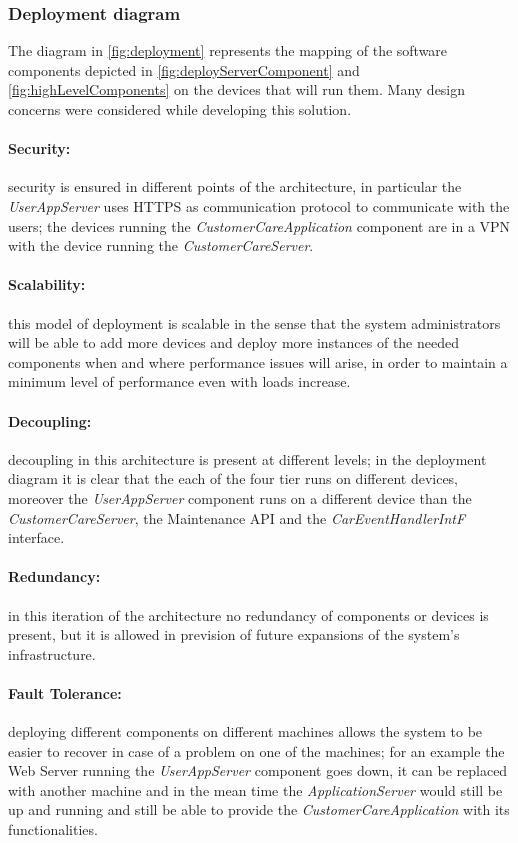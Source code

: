 \subsubsection{Deployment diagram}
The diagram in \autoref{fig:deployment} represents the mapping of the software components depicted in \autoref{fig:deployServerComponent} and \autoref{fig:highLevelComponents} on the devices that will run them. Many design concerns were considered while developing this solution.
\paragraph{Security:}security is ensured in different points of the architecture, in particular the \emph{UserAppServer} uses HTTPS as communication protocol to communicate with the users; the devices running the \emph{CustomerCareApplication} component are in a VPN with the device running the \emph{CustomerCareServer}.
\paragraph{Scalability:}this model of deployment is scalable in the sense that the system administrators will be able to add more devices and deploy more instances of the needed components when and where performance issues will arise, in order to maintain a minimum level of performance even with loads increase.
\paragraph{Decoupling:}decoupling in this architecture is present at different levels; in the deployment diagram it is clear that the each of the four tier runs on different devices, moreover the \emph{UserAppServer} component runs on a different device than the \emph{CustomerCareServer}, the Maintenance API and the \textit{CarEventHandlerIntF} interface.
\paragraph{Redundancy:}in this iteration of the architecture no redundancy of components or devices is present, but it is allowed in prevision of future expansions of the system's infrastructure.
\paragraph{Fault Tolerance:}deploying different components on different machines allows the system to be easier to recover in case of a problem on one of the machines; for an example the Web Server running the \textit{UserAppServer} component goes down, it can be replaced with another machine and in the mean time the \textit{ApplicationServer} would still be up and running and still be able to provide the \textit{CustomerCareApplication} with its functionalities.

